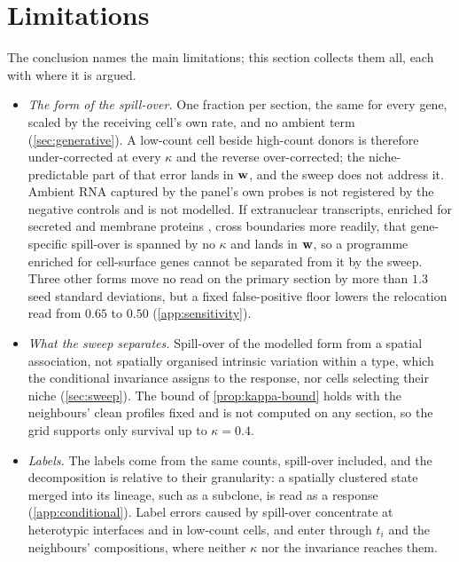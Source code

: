\section{Limitations}
\label{app:limitations}

The conclusion names the main limitations; this section collects them all, each with where it is argued.
\begin{itemize}[leftmargin=*,itemsep=2pt]
\item \emph{The form of the spill-over.} One fraction per section, the same for every gene, scaled by the receiving cell's own rate, and no ambient term (\cref{sec:generative}). A low-count cell beside high-count donors is therefore under-corrected at every $\kappa$ and the reverse over-corrected; the niche-predictable part of that error lands in $\mathbf{w}$, and the sweep does not address it. Ambient RNA captured by the panel's own probes is not registered by the negative controls \citep{janesick2023} and is not modelled. If extranuclear transcripts, enriched for secreted and membrane proteins \citep{xia2019merfish}, cross boundaries more readily, that gene-specific spill-over is spanned by no $\kappa$ and lands in $\mathbf{w}$, so a programme enriched for cell-surface genes cannot be separated from it by the sweep. Three other forms move no read on the primary section by more than $1.3$ seed standard deviations, but a fixed false-positive floor lowers the relocation read from $0.65$ to $0.50$ (\cref{app:sensitivity}).
\item \emph{What the sweep separates.} Spill-over of the modelled form from a spatial association, not spatially organised intrinsic variation within a type, which the conditional invariance assigns to the response, nor cells selecting their niche (\cref{sec:sweep}). The bound of \cref{prop:kappa-bound} holds with the neighbours' clean profiles fixed and is not computed on any section, so the grid supports only survival up to $\kappa = 0.4$.
\item \emph{Labels.} The labels come from the same counts, spill-over included, and the decomposition is relative to their granularity: a spatially clustered state merged into its lineage, such as a subclone, is read as a response (\cref{app:conditional}). Label errors caused by spill-over concentrate at heterotypic interfaces and in low-count cells, and enter through $t_i$ and the neighbours' compositions, where neither $\kappa$ nor the invariance reaches them.

\end{itemize}
